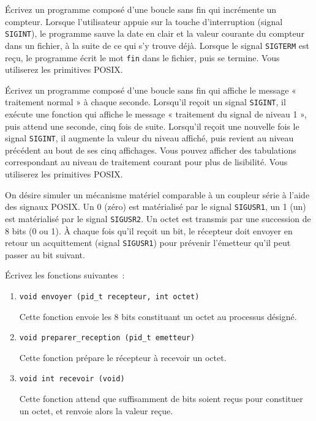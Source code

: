 \question

Écrivez un programme composé d'une boucle sans fin qui
incrémente un compteur. Lorsque l'utilisateur appuie sur la touche
d'interruption (signal {\tt SIGINT}), le programme sauve la date en
clair et la valeur courante du compteur dans un fichier,
à la suite de ce qui s'y trouve déjà.
Lorsque le signal {\tt SIGTERM} est reçu, le programme écrit
le mot {\tt fin} dans le fichier, puis se termine. Vous utiliserez les
primitives POSIX.


\question

Écrivez un programme composé d'une boucle sans fin qui affiche le
message « traitement normal » à chaque seconde. Lorsqu'il reçoit un
signal {\tt SIGINT}, il exécute une fonction qui affiche le message
« traitement du signal de niveau 1 », puis attend une seconde, cinq
fois de suite. Lorsqu'il reçoit une nouvelle fois le signal \texttt
{SIGINT}, il augmente la valeur du niveau affiché, puis revient au
niveau précédent au bout de ses cinq affichages. Vous pouvez afficher
des tabulations correspondant au niveau de traitement courant pour plus
de lisibilité. Vous utiliserez les primitives POSIX.


\question

On désire simuler un mécanisme matériel comparable à un coupleur série
à l'aide des signaux POSIX. Un 0 (zéro) est matérialisé par le signal
{\tt SIGUSR1}, un 1 (un) est matérialisé par le signal {\tt SIGUSR2}.
Un octet est transmis par une succession de 8 bits (0 ou 1).
À chaque fois qu'il reçoit un bit, le récepteur doit envoyer en
retour un acquittement (signal {\tt SIGUSR1}) pour prévenir l'émetteur
qu'il peut passer au bit suivant.

Écrivez les fonctions suivantes~:

\begin {enumerate}
    \item \verb:void envoyer (pid_t recepteur, int octet):

	Cette fonction envoie les 8 bits constituant un octet au
	processus désigné.

    \item \verb:void preparer_reception (pid_t emetteur):

	Cette fonction prépare le récepteur à recevoir un octet.

    \item \verb:void int recevoir (void):

	Cette fonction attend que suffisamment de bits soient reçus
	pour constituer un octet,  et renvoie alors la valeur reçue.

\end {enumerate}


